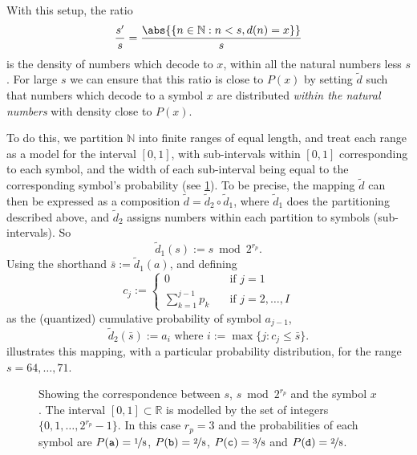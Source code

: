 \documentclass{article}
\theoremstyle{definition}
\begin{document}
With this setup, the ratio
\begin{equation}\label{eq:ratio}
  \frac{s'}{s} = \frac{\abs{\{n\in\mathbb{N}: n < s, d(n) = x\}}}{s}
\end{equation}
is the density of numbers which decode to \(x\), within all the natural numbers
less \(s\). For large \(s\) we can ensure that this ratio is close to \(P(x)\)
by setting \(\tilde d\) such that numbers which decode to a symbol \(x\) are
distributed \emph{within the natural numbers} with density close to \(P(x)\).

To do this, we partition \(\mathbb{N}\) into finite ranges of equal length, and
treat each range as a model for the interval \([0, 1]\), with sub-intervals
within \([0, 1]\) corresponding to each symbol, and the width of each
sub-interval being equal to the corresponding symbol's probability (see
\cref{fig:interval}). To be precise, the mapping \(\tilde d\) can then be
expressed as a composition \(\tilde d = \tilde d_2 \circ \tilde d_1\), where
\(\tilde d_1\) does the partitioning described above, and \(\tilde d_2\)
assigns numbers within each partition to symbols (sub-intervals). So
\begin{equation}
  \tilde d_1(s) := s \bmod 2^{r_p}.
\end{equation}
Using the shorthand \(\bar{s} := \tilde d_1 (a)\), and defining
\begin{equation}
  c_j := \begin{cases}
    0                    &\quad\text{if }j=1\\
    \sum_{k=1}^{j-1} p_k &\quad\text{if }j=2,\ldots,I
  \end{cases}
\end{equation}
as the (quantized) cumulative probability of symbol \(a_{j-1}\),
\begin{equation}
  \tilde d_2(\bar s) := a_i\text{ where }i := \max \{j : c_j \leq \bar s\}.
\end{equation}
 illustrates this mapping, with a particular probability
distribution, for the range \(s = 64,\ldots, 71\).

\begin{figure}[h]
  \centering
  \drawinterval
  \caption{
    Showing the correspondence between \(s\), \(s \bmod 2^{r_p}\) and the
    symbol \(x\). The interval \([0, 1]\subset\mathbb{R}\) is modelled by the
    set of integers \(\{0, 1, \ldots, 2^{r_p} - 1\}\). In this case \(r_p = 3\)
    and the probabilities of each symbol are \(P(\mathtt a) =
    \nicefrac{1}{8}\), \(P(\mathtt b) = \nicefrac{2}{8}\), \(P(\mathtt c) =
    \nicefrac{3}{8}\) and \(P(\mathtt d) = \nicefrac{2}{8}\).}
  \label{fig:interval}
\end{figure}
\end{document}
